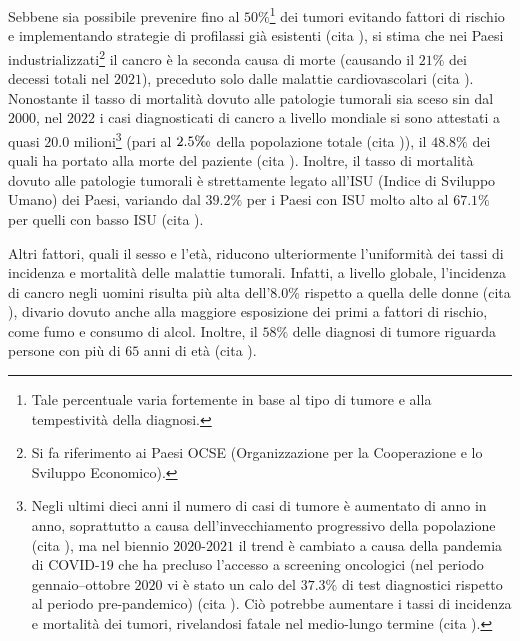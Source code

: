 \documentclass[12pt,a4paper,twoside]{report}
\begin{document}
	Sebbene sia possibile prevenire fino al $50\%$\footnote{Tale percentuale varia fortemente in base al tipo di tumore e alla tempestività della diagnosi.} dei tumori evitando fattori di rischio e implementando strategie di profilassi già esistenti (cita
	), si stima che nei Paesi industrializzati\footnote{Si fa riferimento ai Paesi OCSE (Organizzazione per la Cooperazione e lo Sviluppo Economico).} il cancro è la seconda causa di morte (causando il $21\%$ dei decessi totali nel $2021$), preceduto solo dalle malattie cardiovascolari (cita
	). Nonostante il tasso di mortalità dovuto alle patologie tumorali sia sceso sin dal $2000$, nel $2022$ i casi diagnosticati di cancro a livello mondiale si sono attestati a quasi $20.0$ milioni\footnote{Negli ultimi dieci anni il numero di casi di tumore è aumentato di anno in anno, soprattutto a causa dell'invecchiamento progressivo della popolazione (cita
	), ma nel biennio $2020$-$2021$ il trend è cambiato a causa della pandemia di COVID-$19$ che ha precluso l'accesso a screening oncologici (nel periodo gennaio--ottobre $2020$ vi è stato un calo del $37.3\%$ di test diagnostici rispetto al periodo pre-pandemico) (cita
	). Ciò potrebbe aumentare i tassi di incidenza e mortalità dei tumori, rivelandosi fatale nel medio-lungo termine (cita
	).} (pari al $2.5\tcperthousand$ della popolazione totale (cita %
	)), il $48.8\%$ dei quali ha portato alla morte del paziente (cita
	). Inoltre, il tasso di mortalità dovuto alle patologie tumorali è strettamente legato all'ISU (Indice di Sviluppo Umano) dei Paesi, variando dal $39.2\%$ per i Paesi con ISU molto alto al $67.1\%$ per quelli con basso ISU (cita
	).
	
	Altri fattori, quali il sesso e l'età, riducono ulteriormente l'uniformità dei tassi di incidenza e mortalità delle malattie tumorali. Infatti, a livello globale, l'incidenza di cancro negli uomini risulta più alta dell'$8.0\%$ rispetto a quella delle donne (cita
	), divario dovuto anche alla maggiore esposizione dei primi a fattori di rischio, come fumo e consumo di alcol. Inoltre, il $58\%$ delle diagnosi di tumore riguarda persone con più di $65$ anni di età (cita
	).
	
\end{document}
